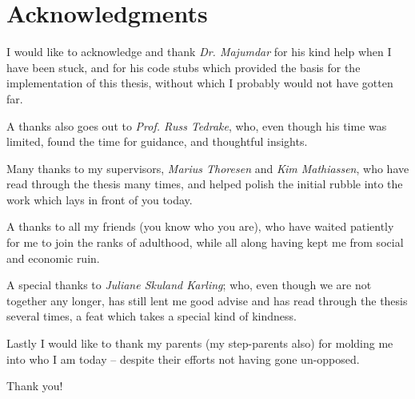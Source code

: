 \chapter*{Acknowledgments}

\noindent \textsf{I} would like to acknowledge and thank \textit{Dr.
  Majumdar} for his kind help when I have been stuck, and for his code stubs
which provided the basis for the implementation of this thesis, without which I
probably would not have gotten far.

\vspace{1em}

\noindent \textsf{A} thanks also goes out to \textit{Prof. Russ
  Tedrake}, who, even though his time was limited, found the time for guidance,
and thoughtful insights.

\vspace{1em}

\noindent \textsf{M}any thanks to my supervisors, \textit{Marius
  Thoresen} and \textit{Kim Mathiassen}, who have read through the thesis many
times, and helped polish the initial rubble into the work which lays in front of
you today.

\vspace{1em}

\noindent \textsf{A} thanks to all my friends (you know who you are),
who have waited patiently for me to join the ranks of adulthood, while all along
having kept me from social and economic ruin.

\vspace{1em}

\noindent \textsf{A} special thanks to \textit{Juliane Skuland
  Karling}; who, even though we are not together any longer, has still lent me
good advise and has read through the thesis several times, a feat which takes a
special kind of kindness.

\vspace{1em}

\noindent \textsf{L}astly I would like to thank my parents (my
step-parents also) for molding me into who I am today -- despite their
efforts not having gone un-opposed. \\[2\onelineskip]
{
  \centering \textsf{Thank you!}\par
}
